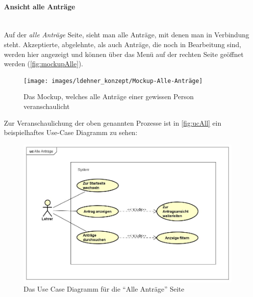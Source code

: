 \paragraph{Ansicht alle Anträge}
~\\
Auf der \textit{alle Anträge} Seite, sieht man alle Anträge, mit denen man in Verbindung steht. Akzeptierte, abgelehnte, als auch Anträge, die noch in Bearbeitung sind, werden hier angezeigt und können über das Menü auf der rechten Seite geöffnet werden (\autoref{fig:mockupAlle}).
\begin{figure}[H]
	\centering
	\texttt{[image: images/ldehner\_konzept/Mockup-Alle-Anträge]}
	\caption[Mockup Alle Anträge]{Das Mockup, welches alle Anträge einer gewissen Person veranschaulicht}
	\label{fig:mockupAlle}
\end{figure}
Zur Veranschaulichung der oben genannten Prozesse ist in \autoref{fig:ucAll} ein beispielhaftes Use-Case Diagramm zu sehen: 
\begin{figure}[H]
	\centering
	\includegraphics[width=1\linewidth]{images/ldehner_konzept/uc-all}
	\caption[Use Case Diagramm Alle Anträge]{Das Use Case Diagramm für die \enquote{Alle Anträge} Seite}
	\label{fig:ucAll}
\end{figure}
\newpage
